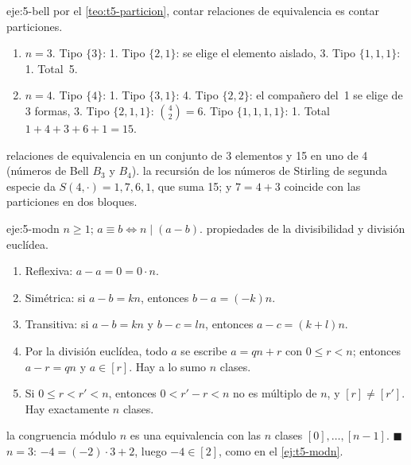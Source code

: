 \begin{solucion}{eje:5-bell}
\planteamiento por el \cref{teo:t5-particion}, contar relaciones de equivalencia es contar particiones.
\pasos
\begin{enumerate}[label=\arabic*.]
  \item $n=3$. Tipo $\{3\}$: 1. Tipo $\{2,1\}$: se elige el elemento aislado, 3. Tipo $\{1,1,1\}$: 1. Total~5.
  \item $n=4$. Tipo $\{4\}$: 1. Tipo $\{3,1\}$: 4. Tipo $\{2,2\}$: el compañero del~1 se elige de 3 formas, 3. Tipo $\{2,1,1\}$: $\binom42=6$. Tipo $\{1,1,1,1\}$: 1. Total $1+4+3+6+1=15$.
\end{enumerate}
 relaciones de equivalencia en un conjunto de 3 elementos y 15 en uno de 4 (números de Bell $B_3$ y $B_4$).
\comprobacion la recursión de los números de Stirling de segunda especie da $S(4,\cdot)=1,7,6,1$, que suma 15; y $7=4+3$ coincide con las particiones en dos bloques.
\end{solucion}

\begin{solucion}{eje:5-modn}
\datos $n\ge1$; $a\equiv b\iff n\mid(a-b)$.
\planteamiento propiedades de la divisibilidad y división euclídea.
\pasos
\begin{enumerate}[label=\arabic*.]
  \item Reflexiva: $a-a=0=0\cdot n$.
  \item Simétrica: si $a-b=kn$, entonces $b-a=(-k)n$.
  \item Transitiva: si $a-b=kn$ y $b-c=ln$, entonces $a-c=(k+l)n$.
  \item Por la división euclídea, todo $a$ se escribe $a=qn+r$ con $0\le r<n$; entonces $a-r=qn$ y $a\in[r]$. Hay a lo sumo $n$ clases.
  \item Si $0\le r<r'<n$, entonces $0<r'-r<n$ no es múltiplo de $n$, y $[r]\neq[r']$. Hay exactamente $n$ clases.
\end{enumerate}
\resultado la congruencia módulo $n$ es una equivalencia con las $n$ clases $[0],\dots,[n-1]$. \hfill$\blacksquare$
\comprobacion $n=3$: $-4=(-2)\cdot3+2$, luego $-4\in[2]$, como en el \cref{ej:t5-modn}.
\end{solucion}

